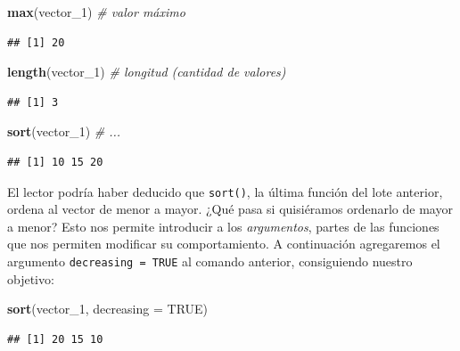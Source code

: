 \documentclass[]{book}
\newenvironment{Shaded}{\begin{snugshade}}{\end{snugshade}}
\newcommand{\KeywordTok}[1]{\textcolor[rgb]{0.13,0.29,0.53}{\textbf{#1}}}
\newcommand{\DataTypeTok}[1]{\textcolor[rgb]{0.13,0.29,0.53}{#1}}
\newcommand{\DecValTok}[1]{\textcolor[rgb]{0.00,0.00,0.81}{#1}}
\newcommand{\CommentTok}[1]{\textcolor[rgb]{0.56,0.35,0.01}{\textit{#1}}}
\newcommand{\OtherTok}[1]{\textcolor[rgb]{0.56,0.35,0.01}{#1}}
\newcommand{\NormalTok}[1]{#1}
\begin{document}
\begin{Shaded}
\begin{Highlighting}[]
\KeywordTok{max}\NormalTok{(vector_}\DecValTok{1}\NormalTok{) }\CommentTok{# valor máximo}
\end{Highlighting}
\end{Shaded}

\begin{verbatim}
## [1] 20
\end{verbatim}

\begin{Shaded}
\begin{Highlighting}[]
\KeywordTok{length}\NormalTok{(vector_}\DecValTok{1}\NormalTok{) }\CommentTok{# longitud (cantidad de valores)}
\end{Highlighting}
\end{Shaded}

\begin{verbatim}
## [1] 3
\end{verbatim}

\begin{Shaded}
\begin{Highlighting}[]
\KeywordTok{sort}\NormalTok{(vector_}\DecValTok{1}\NormalTok{) }\CommentTok{# ...}
\end{Highlighting}
\end{Shaded}

\begin{verbatim}
## [1] 10 15 20
\end{verbatim}

El lector podría haber deducido que \texttt{sort()}, la última función
del lote anterior, ordena al vector de menor a mayor. ¿Qué pasa si
quisiéramos ordenarlo de mayor a menor? Esto nos permite introducir a
los \emph{argumentos}, partes de las funciones que nos permiten
modificar su comportamiento. A continuación agregaremos el argumento
\texttt{decreasing\ =\ TRUE} al comando anterior, consiguiendo nuestro
objetivo:

\begin{Shaded}
\begin{Highlighting}[]
\KeywordTok{sort}\NormalTok{(vector_}\DecValTok{1}\NormalTok{, }\DataTypeTok{decreasing =} \OtherTok{TRUE}\NormalTok{)}
\end{Highlighting}
\end{Shaded}

\begin{verbatim}
## [1] 20 15 10
\end{verbatim}
\end{document}
